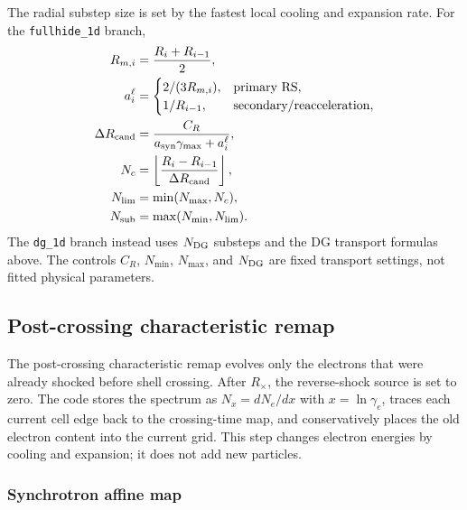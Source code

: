 \documentclass[twocolumn]{aastex702}
\begin{document}
The radial substep size is set by the fastest local cooling and expansion rate.
For the \texttt{fullhide\_1d} branch,
\begin{equation}
\begin{aligned}
R_{m,i}&=\frac{R_i+R_{i-1}}{2},\\
a_i^\ell&=
\begin{cases}
2/(3R_{m,i}), & \hbox{primary RS},\\
1/R_{i-1}, & \hbox{secondary/reacceleration},
\end{cases}\\
\Delta R_{\rm cand}
&=\frac{C_R}{a_{\rm syn}\gamma_{\max}+a_i^\ell},\\
N_c&=\left\lfloor\frac{R_i-R_{i-1}}{\Delta R_{\rm cand}}\right\rfloor,\\
N_{\rm lim}&=\min(N_{\max},N_c),\\
N_{\rm sub}&=\max(N_{\min},N_{\rm lim}).
\end{aligned}
\end{equation}
The \texttt{dg\_1d} branch instead uses \(N_{\rm DG}\) substeps and the DG
transport formulas above.  The controls \(C_R\), \(N_{\min}\), \(N_{\max}\), and
\(N_{\rm DG}\) are fixed transport settings, not fitted physical parameters.

\subsection{Post-crossing characteristic remap}

The post-crossing characteristic remap evolves only the electrons that were
already shocked before shell crossing.  After \(R_\times\), the reverse-shock
source is set to zero.  The code stores the spectrum as
\(N_x=dN_e/dx\) with \(x=\ln\gamma_e\), traces each current cell edge back to
the crossing-time map, and conservatively places the old electron content into
the current grid.  This step changes electron energies by cooling and expansion;
it does not add new particles.

\subsubsection{Synchrotron affine map}
\end{document}
